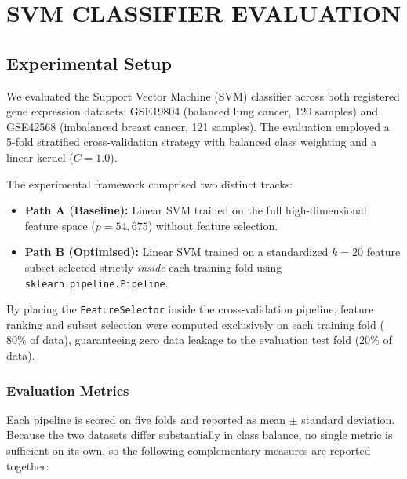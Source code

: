 \chapter{SVM CLASSIFIER EVALUATION}

\section{Experimental Setup}

We evaluated the Support Vector Machine (SVM) classifier across both registered gene expression datasets: GSE19804 (balanced lung cancer, 120 samples) and GSE42568 (imbalanced breast cancer, 121 samples). The evaluation employed a 5-fold stratified cross-validation strategy with balanced class weighting and a linear kernel ($C = 1.0$).

The experimental framework comprised two distinct tracks:
\begin{itemize}
    \item \textbf{Path A (Baseline):} Linear SVM trained on the full high-dimensional feature space ($p = 54,675$) without feature selection.
    \item \textbf{Path B (Optimised):} Linear SVM trained on a standardized $k = 20$ feature subset selected strictly \textit{inside} each training fold using \texttt{sklearn.pipeline.Pipeline}.
\end{itemize}

By placing the \texttt{FeatureSelector} inside the cross-validation pipeline, feature ranking and subset selection were computed exclusively on each training fold ($80\%$ of data), guaranteeing zero data leakage to the evaluation test fold ($20\%$ of data).

\subsection{Evaluation Metrics}

Each pipeline is scored on five folds and reported as mean $\pm$ standard deviation. Because the two datasets differ substantially in class balance, no single metric is sufficient on its own, so the following complementary measures are reported together:

